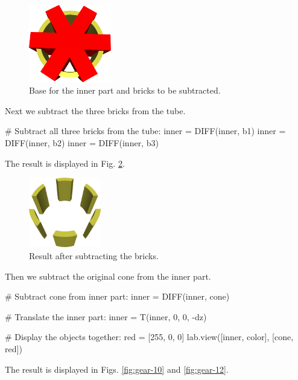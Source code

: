 \begin{figure}[!ht]
\begin{center}
\includegraphics[width=0.32\textwidth]{img/gear-8.png}
\end{center}
\vspace{-4mm}
\caption{Base for the inner part and bricks to be subtracted.}
\label{fig:gear-8}
\end{figure}
\noindent
Next we subtract the three bricks from the tube. 

{\small
\begin{bluecode}
# Subtract all three bricks from the tube:
inner = DIFF(inner, b1)
inner = DIFF(inner, b2)
inner = DIFF(inner, b3)
\end{bluecode}
}
\noindent
The result is displayed in Fig. \ref{fig:gear-9}.\\

\begin{figure}[!ht]
\begin{center}
\includegraphics[width=0.28\textwidth]{img/gear-9.png}
\end{center}
\vspace{-4mm}
\caption{Result after subtracting the bricks.}
\label{fig:gear-9}
\end{figure}

\noindent
Then we subtract the original cone from the inner part. 
{\small
\begin{bluecode}
# Subtract cone from inner part:
inner = DIFF(inner, cone)

# Translate the inner part:
inner = T(inner, 0, 0, -dz)

# Display the objects together:
red = [255, 0, 0]
lab.view([inner, color], [cone, red])
\end{bluecode}
}
\noindent
The result is displayed in Figs. \ref{fig:gear-10} and \ref{fig:gear-12}.\\

